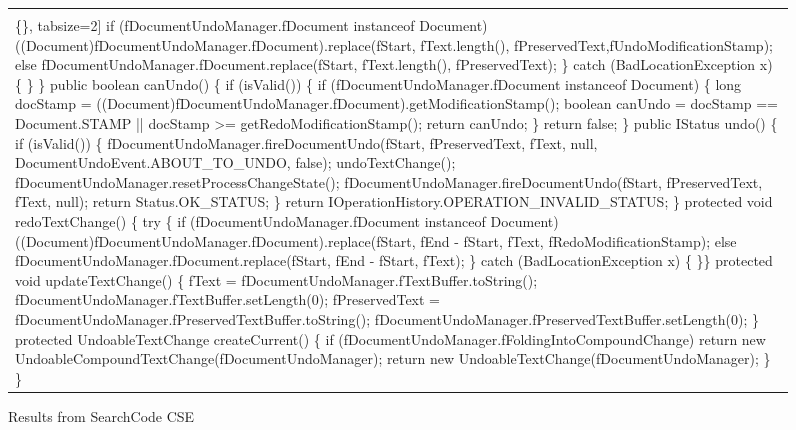 \begin{figure*}[!htb]
\begin{minipage}{1\textwidth}
\begin{tabular}{@{}p{}}
\begin{Verbatim}[commandchars=\\\{\}, tabsize=2]
     if (fDocumentUndoManager.fDocument instanceof Document)
         ((Document)fDocumentUndoManager.fDocument).replace(fStart, fText.length(), fPreservedText,fUndoModificationStamp);
     else
          fDocumentUndoManager.fDocument.replace(fStart, fText.length(), fPreservedText);
            \} catch (BadLocationException x) \{
   \} \}
 public boolean canUndo() \{
   if (isValid()) \{
    if (fDocumentUndoManager.fDocument instanceof Document) \{
      long docStamp = ((Document)fDocumentUndoManager.fDocument).getModificationStamp();
      boolean canUndo = docStamp == Document.STAMP ||  docStamp >= getRedoModificationStamp();
      return canUndo;
  \}
  return false; 
\}
public IStatus undo() \{
  if (isValid()) \{
    fDocumentUndoManager.fireDocumentUndo(fStart, fPreservedText, fText, null, DocumentUndoEvent.ABOUT_TO_UNDO, false);
    undoTextChange();
    fDocumentUndoManager.resetProcessChangeState();
    fDocumentUndoManager.fireDocumentUndo(fStart, fPreservedText, fText, null);
    return Status.OK_STATUS;
  \}
 return IOperationHistory.OPERATION_INVALID_STATUS;
 \}
 protected void redoTextChange() \{
  try \{
    if (fDocumentUndoManager.fDocument instanceof Document)
       ((Document)fDocumentUndoManager.fDocument).replace(fStart, fEnd - fStart, fText, fRedoModificationStamp);
   else
     fDocumentUndoManager.fDocument.replace(fStart, fEnd - fStart, fText);
   \} catch (BadLocationException x) \{
  \}\}
protected void updateTextChange() \{
   fText = fDocumentUndoManager.fTextBuffer.toString();
   fDocumentUndoManager.fTextBuffer.setLength(0);
   fPreservedText = fDocumentUndoManager.fPreservedTextBuffer.toString();
   fDocumentUndoManager.fPreservedTextBuffer.setLength(0);
\}
 protected UndoableTextChange createCurrent() \{
   if (fDocumentUndoManager.fFoldingIntoCompoundChange)
     return new UndoableCompoundTextChange(fDocumentUndoManager);
  return new UndoableTextChange(fDocumentUndoManager);
 \} \}
  \end{Verbatim}
      \vspace{-4mm}
     \\ \hline
\end{tabular} 
\caption{Results from SearchCode CSE}
\label{fig:undoEditor}
\end{minipage}
\end{figure*}






